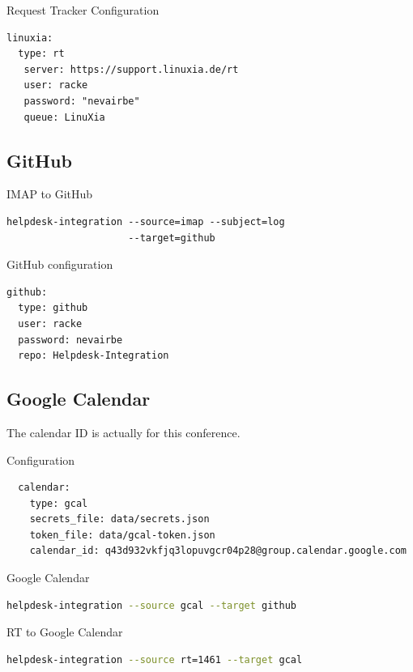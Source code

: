 \begin{frame}[fragile]{Request Tracker Configuration}
\begin{lstlisting}
linuxia:
  type: rt
   server: https://support.linuxia.de/rt
   user: racke
   password: "nevairbe"
   queue: LinuXia
\end{lstlisting}
\end{frame}

\subsection{GitHub}

\begin{frame}[fragile]{IMAP to GitHub}
\begin{lstlisting}
helpdesk-integration --source=imap --subject=log 
                     --target=github
\end{lstlisting}
\end{frame}

\begin{frame}[fragile]{GitHub configuration}
\begin{lstlisting}
github:
  type: github
  user: racke
  password: nevairbe
  repo: Helpdesk-Integration
\end{lstlisting}
\end{frame}


\subsection{Google Calendar}

The calendar ID is actually for this conference.

\begin{frame}[fragile]{Configuration}
\begin{lstlisting}
  calendar:
    type: gcal
    secrets_file: data/secrets.json
    token_file: data/gcal-token.json
    calendar_id: q43d932vkfjq3lopuvgcr04p28@group.calendar.google.com
\end{lstlisting}
\end{frame}

\begin{frame}[fragile]{Google Calendar}
\begin{lstlisting}[language=bash]
helpdesk-integration --source gcal --target github
\end{lstlisting}
\end{frame}

\begin{frame}[fragile]{RT to Google Calendar}
\begin{lstlisting}[language=bash]
helpdesk-integration --source rt=1461 --target gcal
\end{lstlisting}
\end{frame}

